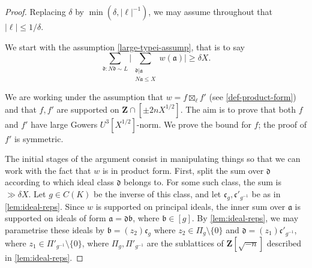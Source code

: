 \documentclass[11pt,reqno]{amsart}
\numberwithin{equation}{section}
\theoremstyle{definition}
\theoremstyle{remark}
\newcommand{\mf}{\mathfrak}
\renewcommand{\le}{\leqslant}
\renewcommand{\ge}{\geqslant}
\newcommand\Z{\mathbf{Z}}
\begin{document}
\begin{proof}
Replacing $\delta$ by $\min(\delta, |\ell|^{-1})$, we may assume throughout that $|\ell| \le 1/\delta$.

We start with the assumption \cref{large-typei-assump}, that is to say 
\begin{equation}\label{assump-rpt} \sum_{\mf{d} : N\mf{d} \sim L} \Big| \sum_{\substack{\mf{d} | \mf{a} \\ N\mf{a} \le X}} w(\mf{a})\Big| \ge \delta X.\end{equation}

We are working under the assumption that $w = f \boxtimes_{\ell} f'$ (see \cref{def-product-form}) and that $f, f'$ are supported on $\Z \cap [\pm 2n X^{1/2}]$. The aim is to prove that both $f$ and $f'$ have large Gowers $U^3[X^{1/2}]$-norm. We prove the bound for $f$; the proof of $f'$ is symmetric.


The initial stages of the argument consist in manipulating things so that we can work with the fact that $w$ is in product form.  First, split the sum over $\mf{d}$ according to which ideal class $\mf{d}$ belongs to. For some such class, the sum is $\gg \delta X$. Let $g \in C(K)$ be the inverse of this class, and let $\mf{c}_g,\mf{c}'_{g^{-1}}$ be as in \cref{lem:ideal-reps}. Since $w$ is supported on principal ideals, the inner sum over $\mf{a}$ is supported on ideals of form $\mf{a} = \mf{d}\mf{b}$, where $\mf{b} \in [g]$. By \cref{lem:ideal-reps}, we may parametrise these ideals by $\mf{b} = (z_2) \mf{c}_g$ where $z_2\in \Pi_g \setminus \{0\}$ and $\mf{d} = (z_1)\mf{c}'_{g^{-1}}$, where $z_1 \in \Pi'_{g^{-1}} \setminus \{0\}$, where $\Pi_g, \Pi'_{g^{-1}}$ are the sublattices of $\Z[\sqrt{-n}]$ described in \cref{lem:ideal-reps}. 


\end{proof}
\end{document}
